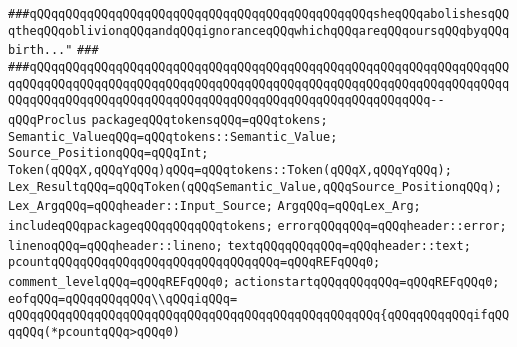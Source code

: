 \verb|###qQQqqQQqqQQqqQQqqQQqqQQqqQQqqQQqqQQqqQQqqQQqqQQqsheqQQqabolishesqQQqtheqQQqoblivionqQQqandqQQqignoranceqQQqwhichqQQqareqQQqoursqQQqbyqQQqbirth..."|\newline
\verb|###|\newline
\verb|###qQQqqQQqqQQqqQQqqQQqqQQqqQQqqQQqqQQqqQQqqQQqqQQqqQQqqQQqqQQqqQQqqQQqqQQqqQQqqQQqqQQqqQQqqQQqqQQqqQQqqQQqqQQqqQQqqQQqqQQqqQQqqQQqqQQqqQQqqQQqqQQqqQQqqQQqqQQqqQQqqQQqqQQqqQQqqQQqqQQqqQQqqQQqqQQqqQQq--qQQqProclus|\newline
\newline
\newline
\newline
\verb|packageqQQqtokensqQQq=qQQqtokens;|\newline
\newline
\verb|Semantic_ValueqQQq=qQQqtokens::Semantic_Value;|\newline
\verb|Source_PositionqQQq=qQQqInt;|\newline
\verb|Token(qQQqX,qQQqYqQQq)qQQq=qQQqtokens::Token(qQQqX,qQQqYqQQq);|\newline
\verb|Lex_ResultqQQq=qQQqToken(qQQqSemantic_Value,qQQqSource_PositionqQQq);|\newline
\newline
\verb|Lex_ArgqQQq=qQQqheader::Input_Source;|\newline
\verb|ArgqQQq=qQQqLex_Arg;|\newline
\newline
\verb|includeqQQqpackageqQQqqQQqqQQqtokens;|\newline
\newline
\verb|errorqQQqqQQq=qQQqheader::error;|\newline
\verb|linenoqQQq=qQQqheader::lineno;|\newline
\verb|textqQQqqQQqqQQq=qQQqheader::text;|\newline
\newline
\verb|pcountqQQqqQQqqQQqqQQqqQQqqQQqqQQqqQQq=qQQqREFqQQq0;|\newline
\verb|comment_levelqQQq=qQQqREFqQQq0;|\newline
\verb|actionstartqQQqqQQqqQQq=qQQqREFqQQq0;|\newline
\newline
\verb|eofqQQq=qQQqqQQqqQQq\\qQQqiqQQq=|\newline
\verb|qQQqqQQqqQQqqQQqqQQqqQQqqQQqqQQqqQQqqQQqqQQqqQQqqQQq{qQQqqQQqqQQqifqQQqqQQq(*pcountqQQq>qQQq0)|\newline
\newline
